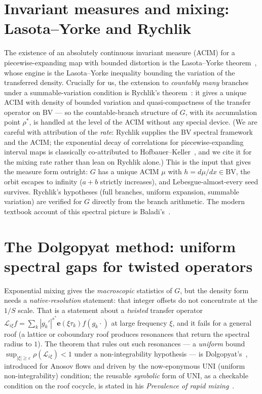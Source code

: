\documentclass[11pt]{article}
\newcommand{\Lop}{\mathcal L}
\begin{document}
\section{Invariant measures and mixing: Lasota--Yorke and Rychlik}
\label{sec:acim}

The existence of an absolutely continuous invariant measure (ACIM) for a
piecewise-expanding map with bounded distortion is the Lasota--Yorke
theorem~\cite{LasotaYorke1973}, whose engine is the Lasota--Yorke inequality
bounding the variation of the transferred density. Crucially for us, the
extension to \emph{countably many} branches under a summable-variation
condition is Rychlik's theorem~\cite{Rychlik1983}: it gives a unique ACIM with
density of bounded variation and quasi-compactness of the transfer operator on
BV --- so the countable-branch structure of $G$, with its accumulation point
$\rho^\ast$, is handled at the level of the ACIM without any special
device. (We are careful with attribution of the \emph{rate}: Rychlik supplies
the BV spectral framework and the ACIM; the exponential decay of correlations
for piecewise-expanding interval maps is classically co-attributed to
Hofbauer--Keller~\cite{HofbauerKeller1982}, and we cite it for the mixing rate
rather than lean on Rychlik alone.) This is the input that gives the measure
form outright: $G$ has a unique ACIM $\mu$ with $h=d\mu/dx\in\mathrm{BV}$, the
orbit escapes to infinity ($a+b$ strictly increases), and
Lebesgue-almost-every seed survives. Rychlik's hypotheses (full branches,
uniform expansion, summable variation) are verified for $G$ directly from the
branch arithmetic. The modern textbook account of this spectral picture is
Baladi's~\cite{Baladi2018}.

\section{The Dolgopyat method: uniform spectral gaps for twisted operators}
\label{sec:dolgopyat}

Exponential mixing gives the \emph{macroscopic} statistics of $G$, but the
density form needs a \emph{native-resolution} statement: that integer offsets
do not concentrate at the $1/S$ scale. That is a statement about a
\emph{twisted} transfer operator $\Lop_{i\xi}f=\sum_k|g_k'|^{s^\ast}
\mathbf e(\xi\tau_k)f(g_k\cdot)$ at large frequency $\xi$, and it fails for a
general roof (a lattice or coboundary roof produces resonances that return the
spectral radius to $1$). The theorem that rules out such resonances --- a
\emph{uniform} bound $\sup_{|\xi|\ge\varepsilon}\rho(\Lop_{i\xi})<1$ under a
non-integrability hypothesis --- is Dolgopyat's~\cite{Dolgopyat1998}, introduced
for Anosov flows and driven by the now-eponymous UNI (uniform
non-integrability) condition; the reusable \emph{symbolic} form of UNI, as a
checkable condition on the roof cocycle, is stated in his \emph{Prevalence of
rapid mixing}~\cite{DolgopyatPrevalence1998}.
\end{document}
